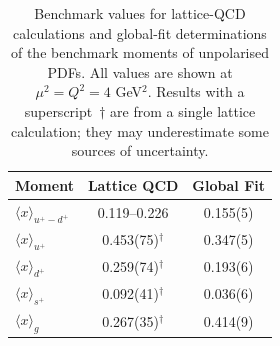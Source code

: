 \begin{table}[!t]
\centering
\renewcommand{\arraystretch}{1.2}
\begin{tabular}{lcc}
\toprule
Moment & Lattice QCD & Global Fit\\
\midrule
$\langle x \rangle_{u^+ -d^+}$ 
& \numrange{0.119}{0.226} 
& 0.155(5)\\
$\langle x \rangle_{u^+}$     
& 0.453(75)$^\dagger$ 
& 0.347(5)\\
$\langle x \rangle_{d^+}$     
& 0.259(74)$^\dagger$ 
& 0.193(6)\\
$\langle x \rangle_{s^+}$     
& 0.092(41)$^\dagger$ 
& 0.036(6)\\
$\langle x\rangle_{g}$       
& 0.267(35)$^\dagger$ 
& 0.414(9)\\
\bottomrule
\end{tabular}
\caption{\small Benchmark values for lattice-QCD calculations and global-fit 
determinations of the benchmark moments of unpolarised PDFs.
%
All values are shown at $\mu^2=Q^2=4$ GeV$^2$.
%
Results with a superscript~$\dagger$ are from a single lattice 
calculation; they may underestimate some sources of uncertainty.}
\label{tab:BMunp}
\end{table}

